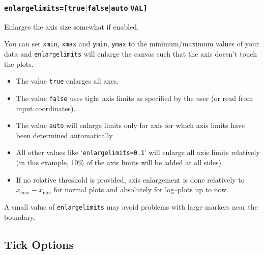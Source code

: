 \subsubsection{\texttt{enlargelimits=[true$|$false$|$auto$|$VAL]}}
Enlarges the axis size somewhat if enabled.

You can set \texttt{xmin}, \texttt{xmax} and \texttt{ymin}, \texttt{ymax} to the minimum/maximum values of your data and \texttt{enlargelimits} will enlarge the canvas such that the axis doesn't touch the plots.

\begin{itemize}
	\item The value \texttt{true} enlarges all axes.
	\item The value \texttt{false} uses tight axis limits as specified by the user (or read from input coordinates).
	\item The value \texttt{auto} will enlarge limits only for axis for which axis limits have been determined automatically.
	\item All other values like `\texttt{enlargelimits=0.1}' will enlarge all axis limits relatively (in this example, 10\% of the axis limits will be added at all sides).
	\item If no relative threshold is provided, axis enlargement is done relatively to $x_\text{max}-x_\text{min}$ for normal plots and absolutely for log--plots up to now.
\end{itemize}
A small value of \texttt{enlargelimits} may avoid problems with large markers near the boundary.





\subsection{Tick Options}

